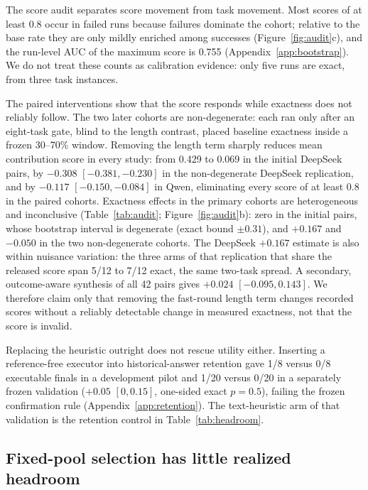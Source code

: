 \documentclass[11pt]{article}
\begin{document}
The score audit separates score movement from task movement. Most scores of at least 0.8 occur in failed runs because failures dominate the cohort; relative to the base rate they are only mildly enriched among successes (Figure~\ref{fig:audit}c), and the run-level AUC of the maximum score is 0.755 (Appendix~\ref{app:bootstrap}). We do not treat these counts as calibration evidence: only five runs are exact, from three task instances.

The paired interventions show that the score responds while exactness does not reliably follow. The two later cohorts are non-degenerate: each ran only after an eight-task gate, blind to the length contrast, placed baseline exactness inside a frozen 30--70\% window. Removing the length term sharply reduces mean contribution score in every study: from 0.429 to 0.069 in the initial DeepSeek pairs, by $-0.308$ $[-0.381,-0.230]$ in the non-degenerate DeepSeek replication, and by $-0.117$ $[-0.150,-0.084]$ in Qwen, eliminating every score of at least 0.8 in the paired cohorts. Exactness effects in the primary cohorts are heterogeneous and inconclusive (Table~\ref{tab:audit}; Figure~\ref{fig:audit}b): zero in the initial pairs, whose bootstrap interval is degenerate (exact bound $\pm0.31$), and $+0.167$ and $-0.050$ in the two non-degenerate cohorts. The DeepSeek $+0.167$ estimate is also within nuisance variation: the three arms of that replication that share the released score span 5/12 to 7/12 exact, the same two-task spread. A secondary, outcome-aware synthesis of all 42 pairs gives $+0.024$ $[-0.095,0.143]$. We therefore claim only that removing the fast-round length term changes recorded scores without a reliably detectable change in measured exactness, not that the score is invalid.

Replacing the heuristic outright does not rescue utility either. Inserting a reference-free executor into historical-answer retention gave 1/8 versus 0/8 executable finals in a development pilot and 1/20 versus 0/20 in a separately frozen validation ($+0.05$ $[0,0.15]$, one-sided exact $p=0.5$), failing the frozen confirmation rule (Appendix~\ref{app:retention}). The text-heuristic arm of that validation is the retention control in Table~\ref{tab:headroom}.

\subsection{Fixed-pool selection has little realized headroom}
\label{sec:res-headroom}
\end{document}
